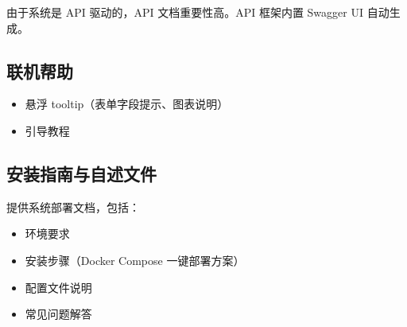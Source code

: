 \documentclass[10pt,a4paper]{article}
\begin{document}
由于系统是 API 驱动的，API 文档重要性高。API 框架内置 Swagger UI 自动生成。

\subsection{联机帮助}

\begin{itemize}
    \item 悬浮 tooltip（表单字段提示、图表说明）
    \item 引导教程
\end{itemize}

\subsection{安装指南与自述文件}

提供系统部署文档，包括：
\begin{itemize}
    \item 环境要求
    \item 安装步骤（Docker Compose 一键部署方案）
    \item 配置文件说明
    \item 常见问题解答
\end{itemize}
\end{document}
